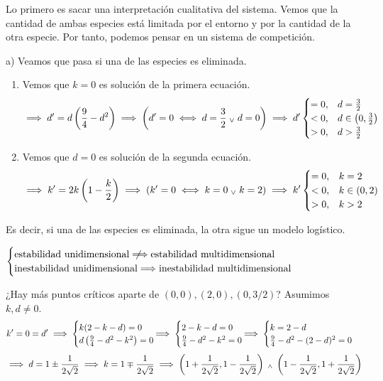 Lo primero es sacar una interpretación cualitativa del sistema. Vemos que la cantidad de ambas especies está limitada por el entorno y por la cantidad de la otra especie. Por tanto, podemos pensar en un sistema de competición.

a) Veamos que pasa si una de las especies es eliminada.
\begin{enumerate}
	\item Vemos que $k=0$ es solución de la primera ecuación.
	      \[\implies d'=d\left(\frac{9}{4} - d^2\right) \implies \left(d'= 0 \iff d = \frac{3}{2} \; _{\vee} \; d= 0\right) \implies d' \begin{cases}
			      = 0, & d = \frac{3}{2}                   \\
			      < 0, & d \in \left(0, \frac{3}{2}\right) \\
			      > 0, & d > \frac{3}{2}
		      \end{cases}\]
	\item Vemos que $d=0$ es solución de la segunda ecuación.
	      \[\implies k' = 2k\left(1-\frac{k}{2}\right) \implies \left(k'=0 \iff k = 0 \; _{\vee} \; k = 2\right) \implies k' \begin{cases}
			      = 0, & k = 2                   \\
			      < 0, & k \in \left(0, 2\right) \\
			      > 0, & k > 2
		      \end{cases}\]
\end{enumerate}
Es decir, si una de las especies es eliminada, la otra sigue un modelo logístico.

 $\begin{cases}
		\tex{estabilidad unidimensional$\nimplies$estabilidad multidimensional} \\
		\tex{inestabilidad unidimensional$\implies$inestabilidad multidimensional}
	\end{cases}$

¿Hay más puntos críticos aparte de $(0,0), (2,0), (0,3/2)$? Asumimos $k,d \neq 0$.
\[k'=0=d'\implies \begin{cases}
		k(2-k-d) = 0 \\
		d\left(\frac{9}{4} - d^2 - k^2\right) = 0
	\end{cases}\hspace{-0.5cm}\implies \begin{cases}
		2-k-d = 0 \\
		\frac{9}{4} - d^2 - k^2 = 0
	\end{cases}\hspace{-0.5cm}\implies \begin{cases}
		k = 2-d \\
		\frac{9}{4} - d^2 - (2-d)^2 = 0
	\end{cases}\]
\[\implies d = 1 \pm \frac{1}{2\sqrt{2}} \implies k = 1 \mp \frac{1}{2\sqrt{2}}\implies \left(1 + \frac{1}{2\sqrt{2}}, 1 - \frac{1}{2\sqrt{2}}\right) \; _{\wedge} \; \left(1 - \frac{1}{2\sqrt{2}}, 1 + \frac{1}{2\sqrt{2}}\right)\]

